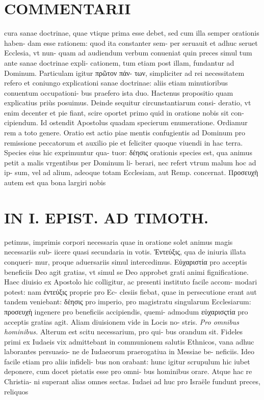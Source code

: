 \documentclass{article}
\begin{document}
\begin{pages}
\section*{COMMENTARII }
\marginpar{[ p.44 ]}\pstart cura sanae doctrinae, quae vtique prima esse debet, sed cum illa semper orationis haben- dam esse rationem: quod ita constanter sem- per seruauit et adhuc seruet Ecclesia, vt nun- quam ad audiendum verbum conueniat quin preces simul tum ante sanae doctrinae expli- cationem, tum etiam post illam, fundantur ad Dominum. Particulam igitur πρῶτον πάν- των, simpliciter ad rei necessitatem refero et coniungo explicationi sanae doctrinae: aliis etiam minutioribus conuentum occupationi- bus praefero ista duo. Hactenus propositio quam explicatius priùs posuimus.  \pend\pstart Deinde sequitur circunstantiarum consi- deratio, vt enim decenter et pie fiant, scire oportet primo quid in oratione nobis sit con- cipiendum. Id ostendit Apostolus quadam specierum enumeratione. Ordiamur rem a toto genere.  \pend\pstart Oratio est actio piae mentis confugientis ad Dominum pro remissione peccatorum et auxilio pie et feliciter quoque viuendi in hac terra. Species eius hic exprimuntur qua- tuor: δέησις orationis species est, qua animus petit a malis vrgentibus per Dominum li- berari, nec refert vtrum malum hoc ad ip- sum, vel ad alium, adeoque totam Ecclesiam, aut Remp. concernat. Προσευχὴ autem est qua bona largiri nobis  \pend
\section*{IN I. EPIST. AD TIMOTH. }
\marginpar{[ p.45 ]}\pstart petimus, imprimis corpori necessaria quae in oratione solet animus magis necessariis sub- iicere quasi secundaria in votis.  \pend\pstart Ἐντεύξις, qua de iniuria illata conqueri- mur, proque aduersariis simul intercedimus. Εὐχαριστία pro acceptis beneficiis Deo agit gratias, vt simul se Deo approbet grati animi fignificatione. Haec diuisio ex Apostolo hic colligitur, ac presenti instituto facile accom- modari potest: nam ἐντεύξις proprie pro Ec- clesiis fiebat, quae in persecutione erant aut tandem veniebant: δέησις pro imperio, pro magistratu singularum Ecclesiarum: προσευχὴ ingenere pro beneficiis accipiendis, quemi- admodum εὐχαρισςτία pro acceptis gratias agit. Aliam diuisionem vide in Locis no- stris.  \pend
\textit{Pro omnibus hominibus. }\pstart Alterum est scitu necessarium, pro qui- bus orandum sit. Fideles primi ex Iudaeis vix admittebant in communionem salutis Ethnicos, vana adhuc laborantes persuasio- ne de Iudaeorum praerogatiua in Messiae be- neficiis. Ideo facile etiam pro aliis infideli- bus non orabant: hunc igitur scrupulum hic iubet deponere, cum docet pietatis esse pro omni- bus hominibus orare. Atque hac re Christia- ni superant alias omnes sectas. Iudaei ad huc pro Israële fundunt preces, reliquos  \pend

\end{pages}
\end{document}
